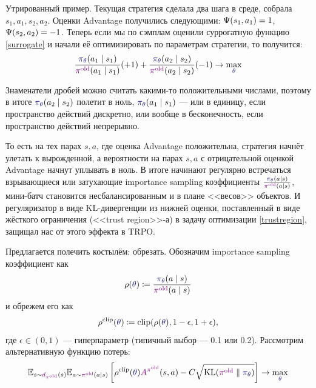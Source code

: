 \begin{example}
Утрированный пример. Текущая стратегия сделала два шага в среде, собрала $s_1, a_1, s_2, a_2$. Оценки Advantage получились следующими: $\Psi(s_1, a_1) \HM= 1$, $\Psi(s_2, a_2) \HM= -1$. Теперь если мы по сэмплам оценили суррогатную функцию \eqref{surrogate} и начали её оптимизировать по параметрам стратегии, то получится:
$$\frac{\textcolor{ChadBlue}{\pi_\theta}(a_1 \mid s_1)}{\textcolor{ChadPurple}{\pi^{\old}}(a_1 \mid s_1)} (+1) + \frac{\textcolor{ChadBlue}{\pi_\theta}(a_2 \mid s_2)}{\textcolor{ChadPurple}{\pi^{\old}}(a_2 \mid s_2)} (-1) \to \max_{\textcolor{ChadBlue}{\theta}}$$

Знаменатели дробей можно считать какими-то положительными числами, поэтому в итоге $\textcolor{ChadBlue}{\pi_\theta}(a_2 \mid s_2)$ полетит в ноль, $\textcolor{ChadBlue}{\pi_\theta}(a_1 \mid s_1)$ --- или в единицу, если пространство действий дискретно, или вообще в бесконечность, если пространство действий непрерывно.
\end{example}

То есть на тех парах $s, a$, где оценка Advantage положительна, стратегия начнёт улетать к вырожденной, а вероятности на парах $s, a$ с отрицательной оценкой Advantage начнут уплывать в ноль. В итоге начинают регулярно встречаться взрывающиеся или затухающие importance sampling коэффициенты $\frac{\textcolor{ChadBlue}{\pi_\theta}(a \mid s)}{\textcolor{ChadPurple}{\pi^{\old}}(a \mid s)}$, мини-батч становится несбалансированным и в плане <<весов>> объектов. И регуляризатор в виде KL-дивергенции из нижней оценки, поставленный в виде жёсткого ограничения (<<trust region>>-а) в задачу оптимизации \eqref{trustregion}, защищал нас от этого эффекта в TRPO.

Предлагается полечить костылём: обрезать. Обозначим importance sampling коэффициент как
$$\rho(\textcolor{ChadBlue}{\theta}) \coloneqq \frac{\textcolor{ChadBlue}{\pi_\theta}(a \mid s)}{\textcolor{ChadPurple}{\pi^{\old}}(a \mid s)}$$
и обрежем его как
$$\rho^{\clip}(\textcolor{ChadBlue}{\theta}) \coloneqq \clip(\rho(\textcolor{ChadBlue}{\theta}), 1 - \epsilon, 1 + \epsilon),$$
где $\epsilon \in (0, 1)$ --- гиперпараметр (типичный выбор --- 0.1 или 0.2). Рассмотрим альтернативную функцию потерь:
\begin{equation*}
\E_{s \sim \textcolor{ChadPurple}{d_{\pi^{\old}}}(s)} \E_{a \sim \textcolor{ChadPurple}{\pi^{\old}}(a \mid s)} \left[ \rho^{\clip}(\textcolor{ChadBlue}{\theta}) \textcolor{ChadPurple}{A^{\pi^{\old}}}(s, a) - C \sqrt{\KL(\textcolor{ChadPurple}{\pi^{\old}} \parallel \textcolor{ChadBlue}{\pi_\theta})} \right] \to \max_{\textcolor{ChadBlue}{\theta}}
\end{equation*}

